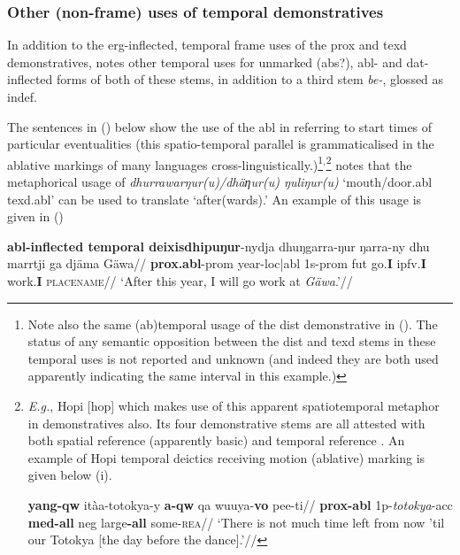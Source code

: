 \subsubsection{Other (non-frame) uses of temporal demonstratives}

In addition to the \gls{erg}-inflected, temporal frame uses of the \gls{prox} and \gls{texd} demonstratives, \citet[255]{Wilkinson1991} notes other temporal uses for unmarked (\gls{abs}?), \gls{abl}- and \gls{dat}-inflected forms of both of these stems, in addition to a third stem \textit{be-}, glossed as \gls{indef}. 

The sentences in () below show the use of the \gls{abl} in referring to start times of particular eventualities (this spatio-temporal parallel is grammaticalised in the ablative markings of many languages cross-linguistically.)\footnote{Note also the same (ab)temporal usage of the \gls{dist} demonstrative in (). The status of any semantic opposition between the \gls{dist} and \gls{texd} stems in these temporal uses is not reported and unknown (and indeed they are both used apparently indicating the same interval in this example.)}$^,$\footnote{\textit{E.g.}, Hopi [\gls{hop}] which makes use of this apparent spatiotemporal metaphor in demonstratives also. Its four demonstrative stems are all attested with both spatial reference (apparently basic) and temporal reference \citep[see][§1.2]{Malotki1983}. An example of Hopi temporal deictics receiving motion (ablative) marking is given below (i).

\pex[exno=i,aboveexskip=0.25em,numoffset=4em]\begingl\gla \textbf{yang-qw} itàa-totokya-y \textbf{a-qw} qa wuuya-\textbf{vo} pee-ti//
\glb \textbf{\gls{prox}-\gls{abl}} 1p-\textit{totokya}-\gls{acc} \textbf{\gls{med}-\gls{all}} \gls{neg} large\textbf{-\gls{all}} some-\textsc{rea}//
\glft`There is not much time left from now 'til our Totokya [the day before the dance].'//\endgl
\xe


} \citet[257]{Wilkinson1991} notes that the metaphorical usage of \textit{dhurra\-war\-ŋur(u)/dhäƞur(u) ŋuliŋur(u)} `mouth/door.\gls{abl} \gls{texd}.\gls{abl}' can be used to translate `after(wards).' An example of this usage is given in ()

\pex{}\textbf{\gls{abl}-inflected temporal deixis}\a\begingl\gla \textbf{dhipuŋur}-nydja dhuŋgarra-ŋur ŋarra-ny dhu marrtji ga djäma Gäwa//
\glb \textbf{\gls{prox}.\gls{abl}}-\gls{prom} year-\gls{loc}|\gls{abl} 1s-\gls{prom} \gls{fut} go.\textbf{I} \gls{ipfv}.\textbf{I} work.\textbf{I} \textsc{placename}//
\glft`After this year, I will go work at \textit{Gäwa}.'//\endgl


